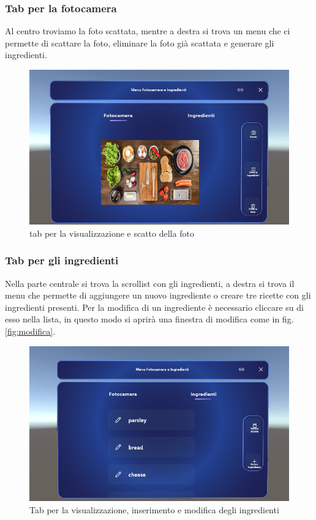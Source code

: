 \subsubsection{Tab per la fotocamera}
Al centro troviamo la foto scattata, mentre a destra si trova un menu che ci permette di scattare la foto, eliminare la foto già scattata e generare gli ingredienti.
\begin{figure}[H]
    \centering
    \includegraphics[width=\textwidth,height=\textheight,keepaspectratio]{figures/chapter_1/FOTOCAMERA_interfaccia.png}
    \caption{tab per la visualizzazione e scatto della foto}
    \label{fig:camera}
\end{figure}

\subsubsection{Tab per gli ingredienti}
Nella parte centrale si trova la scrollist con gli ingredienti, a destra si trova il menu che permette di aggiungere un nuovo ingrediente o creare tre ricette con gli ingredienti presenti. Per la modifica di un ingrediente è necessario cliccare su di esso nella lista, in questo modo si aprirà una finestra di modifica come in fig.\ref{fig:modifica}.

\begin{figure}[H]
    \centering
    \includegraphics[width=\textwidth,height=\textheight,keepaspectratio]{figures/chapter_1/INGREDIENTI_interfaccia.png}
    \caption{Tab per la visualizzazione, inserimento  e modifica degli ingredienti}
    \label{fig:ingredienti}
\end{figure}

